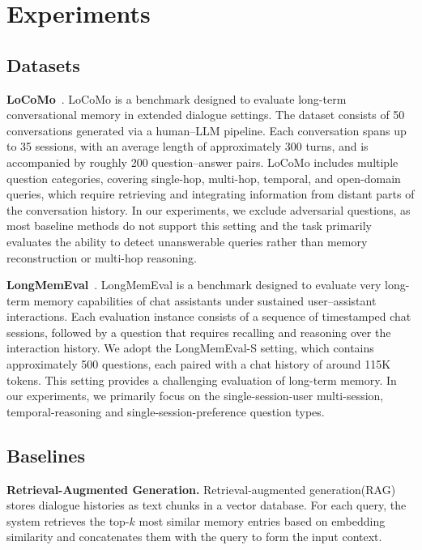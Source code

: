 \documentclass{llmxive}
\begin{document}
\section{Experiments}
\label{app:experiments}
\subsection{Datasets}

\textbf{LoCoMo}~\cite{DBLP:conf/acl/MaharanaLTBBF24}.
LoCoMo is a benchmark designed to evaluate long-term conversational memory in extended dialogue settings.
The dataset consists of 50 conversations generated via a human--LLM pipeline.
Each conversation spans up to 35 sessions, with an average length of approximately 300 turns, and is accompanied by roughly 200 question--answer pairs.
LoCoMo includes multiple question categories, covering single-hop, multi-hop, temporal, and open-domain queries, which require retrieving and integrating information from distant parts of the conversation history.
In our experiments, we exclude adversarial questions, as most baseline methods do not support this setting and the task primarily evaluates the ability to detect unanswerable queries rather than memory reconstruction or multi-hop reasoning.

\textbf{LongMemEval}~\cite{DBLP:conf/iclr/WuWYZCY25}.
LongMemEval is a benchmark designed to evaluate very long-term memory capabilities of chat assistants under sustained user--assistant interactions.
Each evaluation instance consists of a sequence of timestamped chat sessions, followed by a question that requires recalling and reasoning over the interaction history.
We adopt the LongMemEval-S setting, which contains approximately 500 questions, each paired with a chat history of around 115K tokens.
This setting provides a challenging evaluation of long-term memory. In our experiments, we primarily focus on the single-session-user multi-session, temporal-reasoning and  single-session-preference question types.



\subsection{Baselines}
\textbf{Retrieval-Augmented Generation.}
Retrieval-augmented generation(RAG) stores dialogue histories as text chunks in a vector database.
For each query, the system retrieves the top-$k$ most similar memory entries based on embedding similarity and concatenates them with the query to form the input context.
\end{document}
